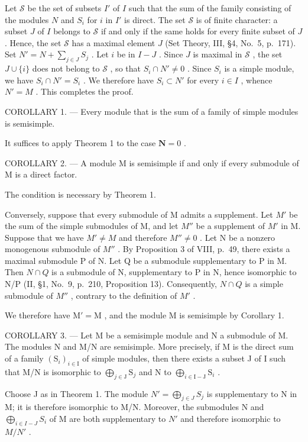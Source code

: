 Let \(\mathcal{S}\) be the set of subsets \(I'\) of \(I\) such that the sum of the family consisting of the modules \(N\) and \(S_i\) for \(i\) in \(I'\) is direct. The set \(\mathcal{S}\) is of finite character: a subset \(J\) of \(I\) belongs to \(\mathcal{S}\) if and only if the same holds for every finite subset of \(J\) . Hence, the set \(\mathcal{S}\) has a maximal element \(J\) (Set Theory, III, §4, No.~5, p.~171). Set \(N' = N + \sum_{j \in J} S_j\) . Let \(i\) be in \(I - J\) . Since \(J\) is maximal in \(\mathcal{S}\) , the set \(J \cup \{i\}\) does not belong to \(\mathcal{S}\) , so that \(S_i \cap N' \neq 0\) . Since \(S_i\) is a simple module, we have \(S_i \cap N' = S_i\) . We therefore have \(S_i \subset N'\) for every \(i \in I\) , whence \(N' = M\) . This completes the proof.

COROLLARY 1. --- Every module that is the sum of a family of simple modules is semisimple.

It suffices to apply Theorem 1 to the case \(\mathbf{N} = 0\) .

COROLLARY 2. --- A module M is semisimple if and only if every submodule of M is a direct factor.

The condition is necessary by Theorem 1.

Conversely, suppose that every submodule of M admits a supplement. Let \(M'\) be the sum of the simple submodules of M, and let \(M''\) be a supplement of \(M'\) in M. Suppose that we have \(M' \neq M\) and therefore \(M'' \neq 0\) . Let N be a nonzero monogenous submodule of \(M''\) . By Proposition 3 of VIII, p.~49, there exists a maximal submodule P of N. Let Q be a submodule supplementary to P in M. Then \(N \cap Q\) is a submodule of N, supplementary to P in N, hence isomorphic to N/P (II, §1, No.~9, p.~210, Proposition 13). Consequently, \(N \cap Q\) is a simple submodule of \(M''\) , contrary to the definition of \(M'\) .

We therefore have \(\mathrm{M}' = \mathrm{M}\) , and the module \(\mathrm{M}\) is semisimple by Corollary 1.

COROLLARY 3. --- Let M be a semisimple module and N a submodule of M. The modules N and M/N are semisimple. More precisely, if M is the direct sum of a family \((\mathrm{S}_i)_{i\in \mathrm{I}}\) of simple modules, then there exists a subset J of I such that M/N is isomorphic to \(\bigoplus_{j\in \mathrm{J}}\mathrm{S}_j\) and N to \(\bigoplus_{i\in \mathrm{I - J}}\mathrm{S}_i\) .

Choose J as in Theorem 1. The module \(N' = \bigoplus_{j \in J} S_j\) is supplementary to N in M; it is therefore isomorphic to M/N. Moreover, the submodules N and \(\bigoplus_{i \in I-J} S_i\) of M are both supplementary to \(N'\) and therefore isomorphic to \(M/N'\) .

